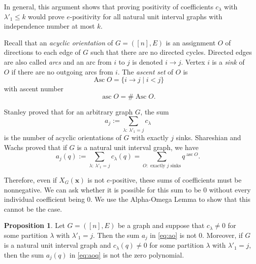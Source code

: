 \documentclass[12pt]{amsart}  %
\theoremstyle{definition}
\newtheorem{proposition}[theorem]{Proposition}
\theoremstyle{remark}
\numberwithin{equation}{section}
\DeclareMathOperator{\Asc}{Asc}
\DeclareMathOperator{\asc}{asc}
\begin{document}
In general, this argument shows that proving positivity of coefficients $c_\lambda$ with $\lambda'_1\leq k$ would prove $e$-positivity for all natural unit interval graphs with independence number at most $k$. 

Recall that an \emph{acyclic orientation} of $G=([n],E)$ is an assignment $O$ of directions to each edge of $G$ such that there are no directed cycles. 
Directed edges are also called {\em arcs} and an arc from $i$ to $j$ is denoted $i\to j$.
Vertex $i$ is a \emph{sink} of $O$ if there are no outgoing arcs from $i$.
The {\em ascent set} of $O$ is
$$
\Asc O = \{i\to j \mid i<j\}
$$
with {ascent number}
$$
\asc O =\#\Asc O.
$$

Stanley \cite[Theorem 3.3]{chromsym} proved that for an arbitrary graph $G$, the sum 
\begin{equation}
\label{eq:ao}
a_j:=\sum_{\lambda: \ \lambda'_1=j}c_\lambda
\end{equation}
is the number of acyclic orientations of $G$ with exactly $j$ sinks. Shareshian and Wachs \cite[Theorem 5.3]{chromposquasi} proved that if $G$ is a natural unit interval graph, we have
\begin{equation}
\label{eq:aoq}
a_j(q):=\sum_{\lambda: \ \lambda'_1=j}c_\lambda(q)=\sum_{O: \text{ exactly }j\text{ sinks}}q^{\asc O}.
\end{equation}

Therefore, even if $X_G(\bm x)$ is not $e$-positive, these sums of coefficients must be nonnegative. We can ask whether it is possible for this sum to be $0$ without every individual coefficient being $0$. We use the Alpha-Omega Lemma to show that this cannot be the case.

\begin{proposition}
Let $G=([n],E)$ be a graph and suppose that $c_\lambda\neq 0$ for some partition $\lambda$ with $\lambda'_1=j$. Then the sum $a_j$ in \eqref{eq:ao} is not $0$. Moreover, if $G$ is a natural unit interval graph and $c_\lambda(q)\neq 0$ for some partition $\lambda$ with $\lambda'_1=j$, then the sum $a_j(q)$ in \eqref{eq:aoq} is not the zero polynomial.
\end{proposition}
\end{document}
